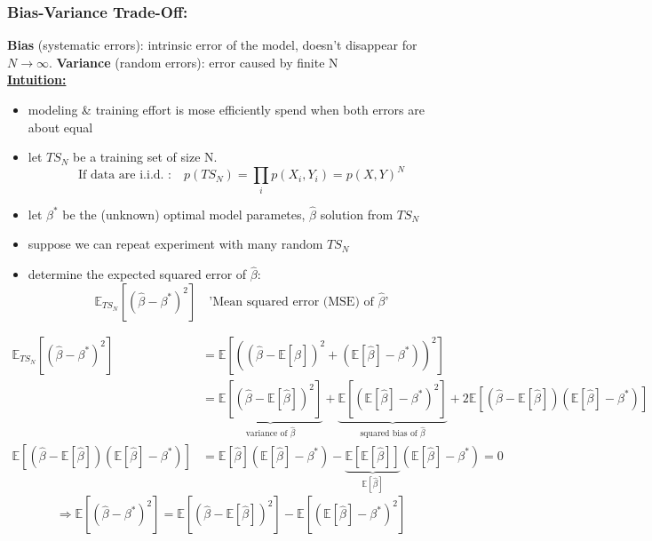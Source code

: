 \documentclass[11pt]{article}
\begin{document}
    \subsubsection{Bias-Variance Trade-Off:} \textbf{Bias} (systematic errors): intrinsic error of
    the model, doesn't disappear for $N \to \infty$. \textbf{Variance} (random errors):
    error caused by finite N \\
    \underline{\textbf{Intuition:}} \begin{itemize}
      \item modeling & training effort is mose efficiently spend when both
      errors are about equal
      \item let $TS_N$ be a training set of size N.
      \begin{equation*}
        \text{If data are i.i.d. :} \quad p(TS_N) = \prod_i p(X_i, Y_i)=p(X,Y)^N
      \end{equation*}
      \item let $\beta^*$ be the (unknown) optimal model parametes, $\hat{\beta}$
      solution from $TS_N$
      \item suppose we can repeat experiment with many random $TS_N$
      \item determine the expected squared error of $\hat{\beta}$:
      \begin{equation*}
         \mathbb{E}_{TS_N} [(\hat{\beta}-\beta^*)^2] \quad \text{'Mean
        squared error (MSE) of $\hat{\beta}$'}
      \end{equation*}
    \end{itemize}
    \begin{equation*}
      \begin{align*}
        \mathbb{E}_{TS_N}[(\hat{\beta}-\beta^*)^2] &= \mathbb{E}[((\hat{\beta}-\mathbb{E}
        [\hat{\beta}])^2+(\mathbb{E}[\hat{\beta}]-\beta^*))^2] \\
        &= \underbrace{\mathbb{E}[(\hat{\beta}-\mathbb{E}[\hat{\beta}])^2]}_{
        \text{variance of $\hat{\beta}$}}+\underbrace{\mathbb{E}[(\mathbb{E}[\hat{\beta}]-\beta^*)^2]}_{
        \text{squared bias of $\hat{\beta}$}} + 2\mathbb{E}[(\hat{\beta}-\mathbb{E}
        [\hat{\beta}])(\mathbb{E}[\hat{\beta}]-\beta^*)] \\
        \mathbb{E}[(\hat{\beta}-\mathbb{E}
        [\hat{\beta}])(\mathbb{E}[\hat{\beta}]-\beta^*)]
        &= \mathbb{E}[\hat{\beta}](\mathbb{E}[\hat{\beta}]-\beta^*)-\underbrace
        {\mathbb{E}[\mathbb{E}[\hat{\beta}]]}_{\mathbb{E}[\hat{\beta}]}(\mathbb
        {E}[\hat{\beta}]-\beta^*) = 0
      \end{align*}
    \end{equation*}
    \begin{equation*}
      \Rightarrow \boxed{\mathbb{E}[(\hat{\beta}-\beta^*)^2] = \mathbb{E}[(
      \hat{\beta}-\mathbb{E}[\hat{\beta}])^2]-\mathbb{E}[(\mathbb{E}
      [\hat{\beta}]-\beta^*)^2]}
    \end{equation*}
\end{document}
